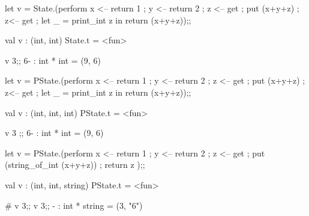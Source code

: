 \begin{enumerate}
\begin{redcode}
let v = State.(perform x <-- return 1 ; y <-- return 2 ; z <-- get ; put (x+y+z) ; 
  z<-- get ; let _ = print_int z in return (x+y+z));;
\end{redcode}
\begin{bluecode}
 val v : (int, int) State.t = <fun>  
\end{bluecode}

\begin{alternate}
  v 3;;
6- : int * int = (9, 6)
\end{alternate}


\begin{redcode}
let v = PState.(perform x <-- return 1 ; y <-- return 2 ; z <-- get ; put (x+y+z) ; 
z<-- get ; let _ = print_int z in return (x+y+z));;
\end{redcode}

\begin{bluecode}
val v : (int, int, int) PState.t = <fun>
\end{bluecode}

\begin{alternate}
v 3 ;;
6- : int * int = (9, 6)  
\end{alternate}

\begin{redcode}
let v = PState.(perform x <-- return 1 ; y <-- return 2 ; z <-- get ; 
put (string_of_int (x+y+z)) ; return z );;
\end{redcode}
\begin{bluecode}
val v : (int, int, string) PState.t = <fun>
\end{bluecode}

\begin{alternate}
# v 3;;
v 3;;
- : int * string = (3, "6")
\end{alternate}

\end{enumerate}



